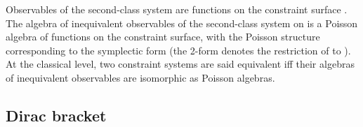 \documentclass[a4paper,11pt]{amsart}
\numberwithin{thm}{section} %
\numberwithin{equation}{section} %
\numberwithin{figure}{section} %
\renewcommand{\:}{{\rm\, :\,}}
\def\manM{{\mathcal M}}
\begin{document}
Observables of the second-class system are functions on the
constraint surface \myHighlight{$\Sigma$}\coordHE{}.  The algebra of inequivalent observables
of the second-class system on \myHighlight{$\manM$}\coordHE{} is a Poisson algebra of
functions on the constraint surface, with the Poisson structure
corresponding to the symplectic form
\myHighlight{$\omega^\Sigma\equiv\omega{\big|}_{\Sigma}$}\coordHE{}
(the 2-form \myHighlight{$\omega{\big|}_{\Sigma}$}\coordHE{} denotes the restriction of
to \myHighlight{$\Sigma\subset\manM$}\coordHE{}).  At the classical level, two constraint
systems are said equivalent iff their algebras of inequivalent
observables are isomorphic as Poisson algebras.




\subsection{Dirac bracket}
\end{document}

